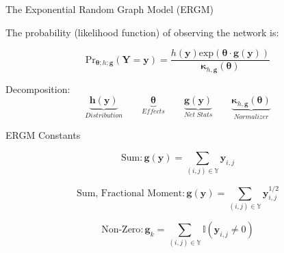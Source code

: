 \documentclass{beamer}
\newcommand{\bt}{\pmb{\theta}}
\begin{document}
\begin{frame}{The Exponential Random Graph Model (ERGM)}

The probability (likelihood function) of observing the network is:

$$ \text{Pr}_{\bm{\theta};h;\bm{g}}( \bm{Y}=\bm{y} )=\frac{ h(\bm{y})\text{exp}( \bm{\theta} \cdot \bm{g} (\bm{y}) )}{\bm{\kappa}_{h,\bm{g}}(\bm{\theta})} $$


Decomposition:
$$
\underbrace{\bm{h(y)}}_{Distribution} \qquad \underbrace{\bt}_{Effects} \qquad \underbrace{\bm{g(y)}}_{Net\hspace{3pt} Stats} \qquad \underbrace{\bm{\kappa}_{h,\bm{g}}(\bm{\theta})} _{Normalizer}
$$



\end{frame}

\begin{frame}{ERGM Constants}

$$\text{Sum}:\bm{g(y)} = \sum_{(i,j) {\in} \mathbb{Y}}\bm{y}_{i,j}$$

$$\text{Sum, Fractional Moment}:\bm{g(y)} = \sum_{(i,j) {\in} \mathbb{Y}}\bm{y}_{i,j}^{1/2}$$

$$\text{Non-Zero}: \bm{g}_k = \sum_{(i,j) {\in} \mathbb{Y}} \mathbb{I}(\bm{y}_{i,j} \neq 0)$$

\end{frame}
\end{document}

